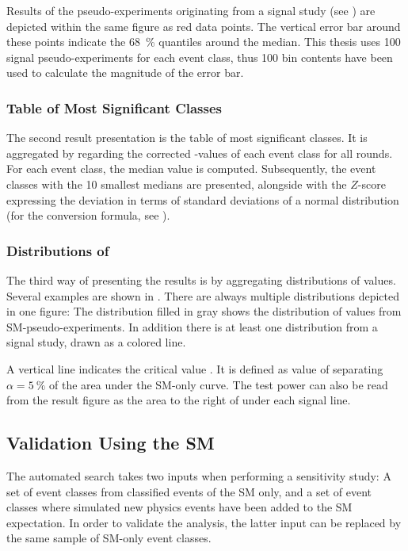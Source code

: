 Results of the pseudo-experiments originating from a signal study (see ) are depicted within the same figure as red data points. The vertical error bar around these points indicate the \SI{68}{\percent} quantiles around the median. This thesis uses \num{100} signal pseudo-experiments for each event class, thus \num{100} bin contents have been used to calculate the magnitude of the error bar.

\subsubsection{Table of Most Significant Classes}
The second result presentation is the table of most significant classes. It is aggregated by regarding the corrected \ptilde-values of each event class for all rounds. For each event class, the median \ptilde value is computed. Subsequently, the event classes with the \num{10} smallest medians are presented, alongside with the $Z$-score expressing the deviation in terms of standard deviations of a normal distribution (for the conversion formula, see ). 

\subsubsection{Distributions of \TSphat}
The third way of presenting the results is by aggregating distributions of \TSphat values. Several examples are shown in . There are always multiple distributions depicted in one figure: The distribution filled in gray shows the distribution of \TSphat values from \ac{SM}-pseudo-experiments. In addition there is at least one distribution from a signal study, drawn as a colored line. 

A vertical line indicates the critical value \TSphatcrit. It is defined as value of \TSphat separating $\alpha = \SI{5}{\percent}$ of the area under the \ac{SM}-only curve. The test power can also be read from the result figure as the area to the right of \TSphatcrit under each signal line.

\subsection{Validation Using the \ac{SM}}
The automated search takes two inputs when performing a sensitivity study: A set of event classes from classified events of the \ac{SM} only, and a set of event classes where simulated new physics events have been added to the \ac{SM} expectation. In order to validate the analysis, the latter input can be replaced by the same sample of \ac{SM}-only event classes. 


